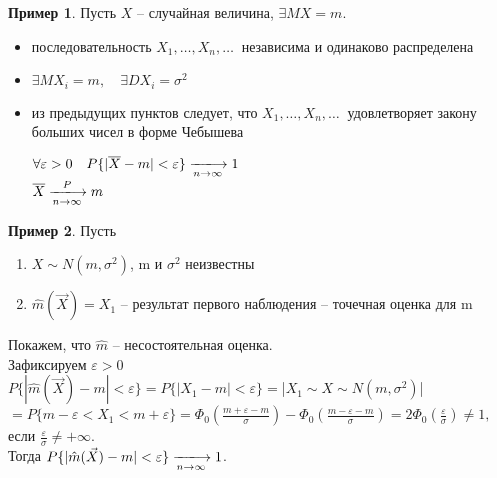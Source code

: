 \documentclass[a4paper, 12pt]{article}
\theoremstyle{definition}
\theoremstyle{leads}
\theoremstyle{example}
\newtheorem{example}{Пример}
\newcommand{\infseq}[3]{%
	\ensuremath{#1_#2, \dots, #1_#3, \dots}\ }
\newcommand{\infseqX}{%
	\infseq{X}{1}{n}}
\begin{document}
\begin{example}
Пусть $X$ -- случайная величина, $\exists MX = m$.
	\begin{itemize}
		\item последовательность $\infseqX$ независима и одинаково распределена
		\item $\exists MX_i = m, \quad \exists DX_i = \sigma^2$
		\item из предыдущих пунктов следует, что $\infseqX$ удовлетворяет закону больших чисел в форме Чебышева
		\begin{center}
			\centering
			$\forall \varepsilon > 0 \quad P\{| \overline{X} - m | < \varepsilon \} \xlongrightarrow[n \rightarrow \infty]{} 1$\\
			$ \overline{X} \xlongrightarrow[n \rightarrow \infty]{P} m$
		\end{center}
	\end{itemize}
\end{example}

\begin{example}
	Пусть
	\begin{enumerate}
		\item $X \sim N(m, \sigma^2)$, m и $\sigma^2$ неизвестны
		\item $\hat{m}(\vec{X}) = X_1$ -- результат первого наблюдения -- точечная оценка для m
	\end{enumerate}
Покажем, что $\hat{m}$ -- несостоятельная оценка.\\
Зафиксируем $\varepsilon > 0$ \\
$P\{|\hat{m}(\vec{X}) - m| < \varepsilon\} = P\{|X_1 - m| < \varepsilon\} = $|$X_1 \sim X \sim N(m, \sigma^2)$|$ = P\{m - \varepsilon < X_1 < m + \varepsilon\} = \Phi_0(\frac{m + \varepsilon - m}{\sigma}) - \Phi_0(\frac{m - \varepsilon - m}{\sigma}) = 2\Phi_0(\frac{\varepsilon}{\sigma}) \neq 1, $ если $\frac{\varepsilon}{\sigma} \neq +\infty$.\\
Тогда $P\{|\hat{m}(\vec{X}) - m| < \varepsilon\} \xlongrightarrow[n \rightarrow \infty]{} 1$.
\end{example}
\end{document}

